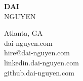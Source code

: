 \documentclass[letterpage]{article}
\begin{document}
\thispagestyle{empty} %
\begin{minipage}[c]{0.4\linewidth}
  \raggedright
  \textbf{\fontsize{37px}{1px}\selectfont\textsf{DAI}}\\
  \vspace{7px}
  {\fontsize{37px}{1px}\selectfont\textsf{NGUYEN}}
\end{minipage}
\begin{minipage}{0.01\linewidth}
\end{minipage}
\:\:\:\:\: %
\begin{minipage}[t]{0.31\linewidth}
  \raggedleft
  \vspace*{-30px}
  Atlanta, GA\enspace\faGlobe\\
  dai-nguyen.com\enspace\faGlobe\\
  hire@dai-nguyen.com\enspace\faPaperPlane\\
  linkedin.dai-nguyen.com\enspace\faLinkedin\\
  github.dai-nguyen.com\enspace\faGithubAlt\\
\end{minipage}
\:\:\:\:\: %
\begin{minipage}[c]{0.2\linewidth}
  \raggedright
\end{minipage}
\end{document}
